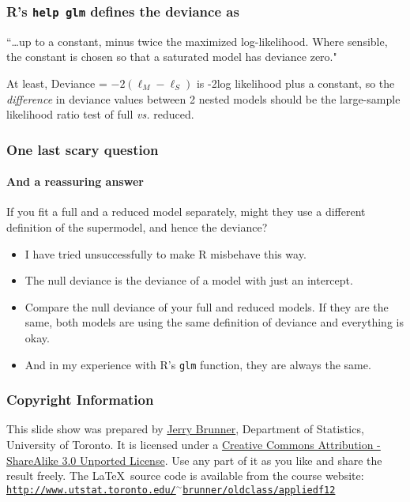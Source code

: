 \documentclass[serif]{beamer} %
\begin{document}
\begin{frame}
\frametitle{R's \texttt{help glm} defines the deviance as}
``\dots up to a constant, minus twice the maximized log-likelihood. Where sensible, the constant is chosen so that a saturated model has deviance zero."

\vspace{10mm}

At least, Deviance = $-2(\ell_M-\ell_S)$ is -2log likelihood  plus a constant, so the \emph{difference} in deviance values between 2 nested models should be the large-sample likelihood ratio test of full \emph{vs.} reduced.
\end{frame}


\begin{frame}
\frametitle{One last scary question}
\framesubtitle{And a reassuring answer}
If you fit a full and a reduced model separately, might they use a different definition of the supermodel, and hence the deviance?
  \begin{itemize}
    \item I have tried unsuccessfully to make R misbehave this way.
    \item The null deviance is the deviance of a model with just an intercept.
    \item Compare the null deviance of your full and reduced models. If they are the same, both models are using the same definition of deviance and everything is okay.
    \item And in my experience with R's \texttt{glm} function, they are always the same.
  \end{itemize}
\end{frame}



\begin{frame}
\frametitle{Copyright Information}

This slide show was prepared by  \href{http://www.utstat.toronto.edu/~brunner}{Jerry Brunner},
Department of Statistics, University of Toronto. It is licensed under a 
\href{http://creativecommons.org/licenses/by-sa/3.0/deed.en_US}
     {Creative Commons Attribution - ShareAlike 3.0 Unported License}. Use any part of it as you like and share the result freely. The \LaTeX~source code is available from the course website:
\href{http://www.utstat.toronto.edu/~brunner/oldclass/appliedf12} {\texttt{http://www.utstat.toronto.edu/$^\sim$brunner/oldclass/appliedf12}}

\end{frame}
\end{document}
